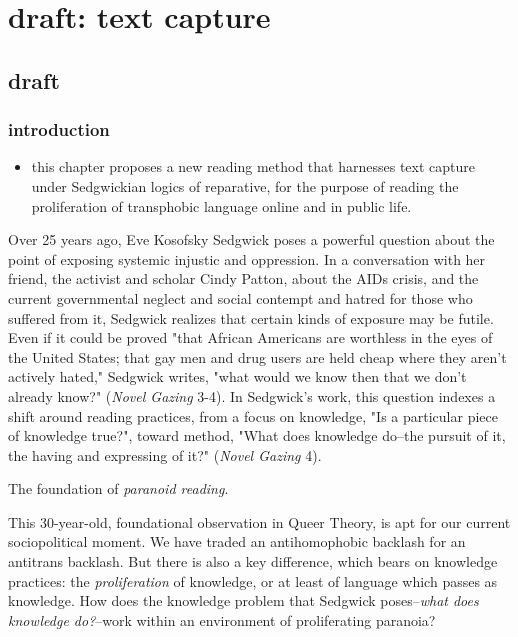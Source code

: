 \documentclass[11pt]{article}
\author{fcalado}
\date{\today}
\title{}
\begin{document}
\tableofcontents

\section{draft: text capture}
\label{sec:org313f237}
\subsection{draft}
\label{sec:orgdc32c5e}
\subsubsection{introduction}
\label{sec:orgd7c4022}
\begin{itemize}
\item this chapter proposes a new reading method that harnesses text
capture under Sedgwickian logics of reparative, for the purpose of
reading the proliferation of transphobic language online and in
public life.
\end{itemize}

Over 25 years ago, Eve Kosofsky Sedgwick poses a powerful question
about the point of exposing systemic injustic and oppression. In a
conversation with her friend, the activist and scholar Cindy Patton,
about the AIDs crisis, and the current governmental neglect and social
contempt and hatred for those who suffered from it, Sedgwick realizes
that certain kinds of exposure may be futile. Even if it could be
proved "that African Americans are worthless in the eyes of the United
States; that gay men and drug users are held cheap where they aren't
actively hated," Sedgwick writes, "what would we know then that we
don't already know?" (\emph{Novel Gazing} 3-4). In Sedgwick's work, this
question indexes a shift around reading practices, from a focus on
knowledge, "Is a particular piece of knowledge true?", toward method,
"What does knowledge do--the pursuit of it, the having and expressing
of it?" (\emph{Novel Gazing} 4).

The foundation of \emph{paranoid reading}.

This 30-year-old, foundational observation in Queer Theory, is apt for
our current sociopolitical moment. We have traded an antihomophobic
backlash for an antitrans backlash. But there is also a key
difference, which bears on knowledge practices: the \emph{proliferation} of
knowledge, or at least of language which passes as knowledge. How does
the knowledge problem that Sedgwick poses--\emph{what does knowledge
do?}--work within an environment of proliferating paranoia?
\end{document}
